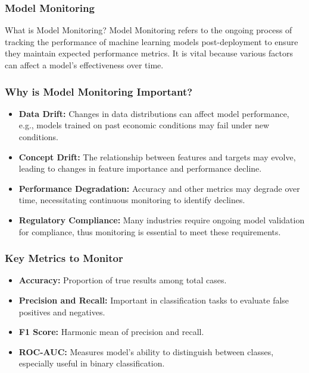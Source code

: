 \documentclass[aspectratio=169]{beamer}
\begin{document}
\begin{frame}[fragile]
    \frametitle{Model Monitoring}
    \begin{block}{What is Model Monitoring?}
        Model Monitoring refers to the ongoing process of tracking the performance of machine learning models post-deployment to ensure they maintain expected performance metrics. It is vital because various factors can affect a model's effectiveness over time.
    \end{block}
\end{frame}

\begin{frame}[fragile]
    \frametitle{Why is Model Monitoring Important?}
    \begin{itemize}
        \item \textbf{Data Drift:} Changes in data distributions can affect model performance, e.g., models trained on past economic conditions may fail under new conditions.
        \item \textbf{Concept Drift:} The relationship between features and targets may evolve, leading to changes in feature importance and performance decline.
        \item \textbf{Performance Degradation:} Accuracy and other metrics may degrade over time, necessitating continuous monitoring to identify declines.
        \item \textbf{Regulatory Compliance:} Many industries require ongoing model validation for compliance, thus monitoring is essential to meet these requirements.
    \end{itemize}
\end{frame}

\begin{frame}[fragile]
    \frametitle{Key Metrics to Monitor}
    \begin{itemize}
        \item \textbf{Accuracy:} Proportion of true results among total cases.
        \item \textbf{Precision and Recall:} Important in classification tasks to evaluate false positives and negatives.
        \item \textbf{F1 Score:} Harmonic mean of precision and recall.
        \item \textbf{ROC-AUC:} Measures model's ability to distinguish between classes, especially useful in binary classification.
    \end{itemize}
\end{frame}
\end{document}
